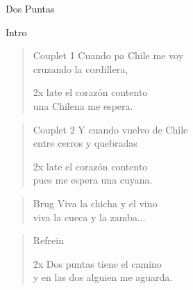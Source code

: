 \begin{song}{Dos Puntas}

\begin{instrumental}{Intro}
\measure{}\measure{}\measure{}\measure{}\measure{}\measure{}\measure{}
\end{instrumental}

\begin{verse}{Couplet 1}
Cuando pa Chile me voy\\
cruzando la cordillera,\\
\begin{sidenote}{2x}
late el corazón contento \\
una Chilena me espera.
\end{sidenote}
\end{verse}

\begin{verse}{Couplet 2}
Y cuando vuelvo de Chile\\
entre cerros y quebradas\\
\begin{sidenote}{2x}
late el corazón contento \\
pues me espera una cuyana.  
\end{sidenote}
\end{verse}

\begin{verse}{Brug}
Viva la chicha y el vino\\
viva la cueca y la zamba...\\
\end{verse}

\begin{verse}{Refrein}
\begin{sidenote}{2x}
Dos puntas tiene el camino \\
y en las dos alguien me aguarda.
\end{sidenote}
\end{verse}


\end{song}
